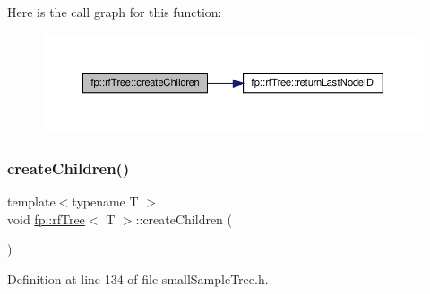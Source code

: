 Here is the call graph for this function\+:
\nopagebreak
\begin{figure}[H]
\begin{center}
\leavevmode
\includegraphics[width=350pt]{classfp_1_1rfTree_ad226037e7f93c0fa2a1a960e19a87bed_cgraph}
\end{center}
\end{figure}
\mbox{\label{classfp_1_1rfTree_ad226037e7f93c0fa2a1a960e19a87bed}} 
\subsubsection{\texorpdfstring{create\+Children()}{createChildren()}\hspace{0.1cm}{\footnotesize\ttfamily [2/2]}}
{\footnotesize\ttfamily template$<$typename T $>$ \\
void \hyperlink{classfp_1_1rfTree}{fp\+::rf\+Tree}$<$ T $>$\+::create\+Children (\begin{DoxyParamCaption}{ }\end{DoxyParamCaption})\hspace{0.3cm}{\ttfamily [inline]}}



Definition at line 134 of file small\+Sample\+Tree.\+h.


